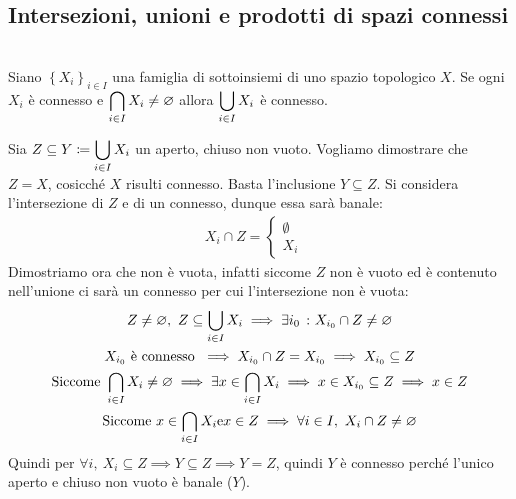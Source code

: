 \subsection{Intersezioni, unioni e prodotti di spazi connessi}
\begin{theorema}~{}\label{unione sottospazi connessi}\\
Siano $\left\{ X_i \right\}_{i\in I}$ una famiglia di sottoinsiemi di uno spazio topologico $X$. Se ogni $X_i$ è connesso e $\displaystyle\mathop{{\bigcap}}\displaylimits_{i\in I}X_i\neq\varnothing$ allora $\displaystyle\mathop{{\bigcup}}\displaylimits_{i\in I}X_i$ è connesso.	
\end{theorema}
\begin{demonstration}
	Sia $\displaystyle Z\subseteq Y\coloneqq \mathop{{\bigcup}}\displaylimits_{i\in I}X_i$ un aperto, chiuso non vuoto. Vogliamo dimostrare che $Z=X$, cosicché $X$ risulti connesso. Basta l'inclusione $Y\subseteq Z$.\newline
	Si considera l'intersezione di $Z$ e di un connesso, dunque essa sarà banale:
	\begin{gather*}
		X_i \cap Z = \begin{cases}
			\emptyset & \\
			X_i	&		
		\end{cases}
	\end{gather*}
	Dimostriamo ora che non è vuota, infatti siccome $Z$ non è vuoto ed è contenuto nell'unione ci sarà un connesso per cui l'intersezione non è vuota:
		\begin{gather*}
			Z\neq\varnothing, \ Z\subseteq \mathop{{\bigcup}}\displaylimits_{i\in I}X_i \implies \exists i_0 \ \colon X_{i_0}\cap Z\neq \varnothing	\\
			X_{i_0} \text{ è connesso } \implies X_{i_0}\cap Z=X_{i_0} \implies X_{i_0}\subseteq Z \\
			\text{Siccome } \mathop{{\bigcap}}\displaylimits_{i\in I}X_i\neq\varnothing \implies \exists x\in\mathop{{\bigcap}}\displaylimits_{i\in I}X_i \implies x\in X_{i_0}\subseteq Z \implies x\in Z	\\
			\text{Siccome } x\in\mathop{{\bigcap}}\displaylimits_{i\in I}X_i \text{e} x\in Z \implies \forall i\in I, \ X_i\cap Z\neq\varnothing
		\end{gather*}
	Quindi per $\forall i, \ X_i\subseteq Z \implies Y\subseteq Z \implies Y=Z$, quindi $Y$ è connesso perché l'unico aperto e chiuso non vuoto è banale ($Y$).
\end{demonstration}

